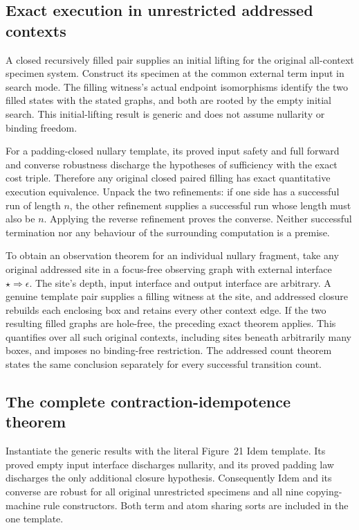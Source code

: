 \subsection{Exact execution in unrestricted addressed contexts}
A closed recursively filled pair supplies an initial lifting for the original
all-context specimen system. Construct its specimen at the common external
term input in search mode. The filling witness's actual endpoint isomorphisms
identify the two filled states with the stated graphs, and both are rooted
by the empty initial search. This initial-lifting result is generic and does
not assume nullarity or binding freedom.

For a padding-closed nullary template, its proved input safety and full
forward and converse robustness discharge the hypotheses of sufficiency
with the exact cost triple. Therefore any original closed paired filling
has exact quantitative execution equivalence. Unpack the two refinements:
if one side has a successful run of length $n$, the other refinement supplies
a successful run whose length must also be $n$. Applying the reverse
refinement proves the converse. Neither successful termination nor any
behaviour of the surrounding computation is a premise.

To obtain an observation theorem for an individual nullary fragment, take
any original addressed site in a focus-free observing graph with external
interface $\star\Rightarrow\epsilon$. The site's depth, input interface and
output interface are arbitrary. A genuine template pair supplies a filling
witness at the site, and addressed closure rebuilds each enclosing box and
retains every other context edge. If the two resulting filled graphs are
hole-free, the preceding exact theorem applies. This quantifies over all
such original contexts, including sites beneath arbitrarily many boxes,
and imposes no binding-free restriction. The addressed count theorem states
the same conclusion separately for every successful transition count.

\subsection{The complete contraction-idempotence theorem}
Instantiate the generic results with the literal Figure~21 Idem template.
Its proved empty input interface discharges nullarity, and its proved
padding law discharges the only additional closure hypothesis. Consequently
Idem and its converse are robust for all original unrestricted specimens
and all nine copying-machine rule constructors. Both term and atom sharing
sorts are included in the one template.

